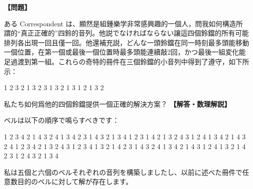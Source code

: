 \documentclass[10pt,a4paper,oneside,openany]{ltjsbook}
\begin{document}
\begin{tcolorbox}[colback=softblue,colframe=primaryblue,title=\textbf{第 268 問：ベルの鳴らし方 （原題: THE PEAL OF BELLS.）},arc=2mm,boxrule=1pt,breakable]
\textbf{【問題】}\par\vspace{0.3em}
ある Correspondent は、顯然是組鍾樂学非常感興趣的一個人，問我如何構造所謂的“真正正確的”四鈴的音列。他説でなければならない讓這四個鈴鐺的所有可能排列各出現一回且僅一回。他還補充説，どんな一頭鈴鐺在同一時刻最多頭能移動一個位置，在第一個或最後一個位置時最多頭能連續敲2回，かつ最後一組変化能足過渡到第一組。これらの奇特的冊件在三個鈴鐺的小音列中得到了遵守，如下所示：

    1   2   3 
    2   1   3 
    2   3   1 
    3   2   1 
    3   1   2 
    1   3   2

私たち如何爲他的四個鈴鐺提供一個正確的解決方案？
\tcblower
\textbf{【解答・数理解説】}\par\vspace{0.3em}
ベルは以下の順序で鳴らすべきです：

    1 2 3 4 
    2 1 4 3 
    2 4 1 3 
    4 2 3 1 
    4 3 2 1 
    3 4 1 2 
    3 1 4 2 
    1 3 2 4 
    3 1 2 4 
    1 3 4 2 
    1 4 3 2 
    4 1 2 3 
    4 2 1 3 
    2 4 3 1 
    2 3 4 1 
    3 2 1 4 
    2 3 1 4 
    3 2 4 1 
    3 4 2 1 
    4 3 1 2 
    4 1 3 2 
    1 4 2 3 
    1 2 4 3 
    2 1 3 4

私は五個と六個のベルそれぞれの音列を構築しましたし、以前に述べた冊件で任意数目的のベルに対して解が存在します。
\end{tcolorbox}
\end{document}
